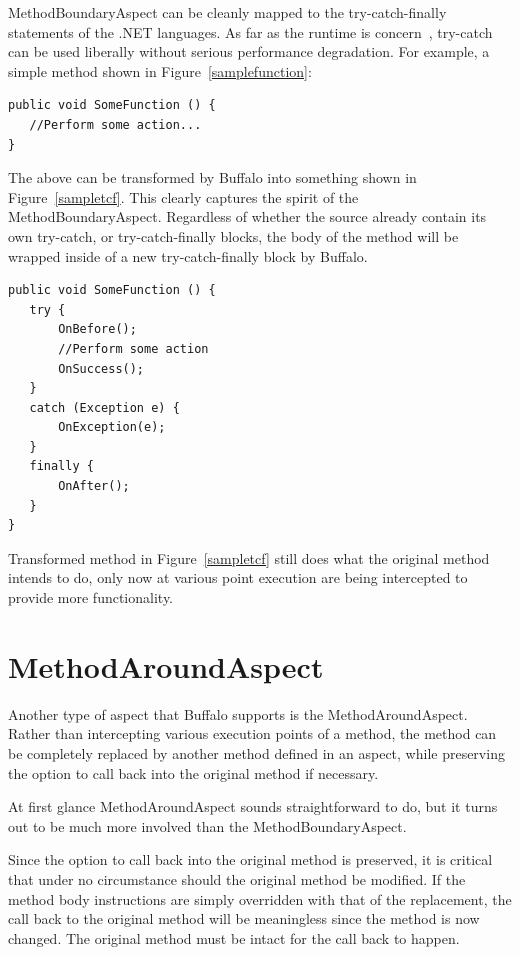 MethodBoundaryAspect can be cleanly mapped to the try-catch-finally statements of the .NET languages. As far as the runtime is concern~\cite{ecma334, ecma335}, try-catch can be used liberally without serious performance degradation. For example, a simple method shown in Figure~\ref{samplefunction}:

\begin{lstlisting}[caption={Sample function}, label=samplefunction]
public void SomeFunction () {
   //Perform some action...
}
\end{lstlisting}

The above can be transformed by Buffalo into something shown in Figure~\ref{sampletcf}. This clearly captures the spirit of the MethodBoundaryAspect. Regardless of whether the source already contain its own try-catch, or try-catch-finally blocks, the body of the method will be wrapped inside of a new try-catch-finally block by Buffalo.

\begin{lstlisting}[caption={Sample try-catch-finally}, label=sampletcf]
public void SomeFunction () {
   try {
       OnBefore();
       //Perform some action
       OnSuccess();
   }
   catch (Exception e) {
       OnException(e);
   }
   finally {
       OnAfter();
   }
}
\end{lstlisting}

Transformed method in Figure~\ref{sampletcf} still does what the original method intends to do, only now at various point execution are being intercepted to provide more functionality. 

\section{MethodAroundAspect}
Another type of aspect that Buffalo supports is the MethodAroundAspect. Rather than intercepting various execution points of a method, the method can be completely replaced by another method defined in an aspect, while preserving the option to call back into the original method if necessary.

At first glance MethodAroundAspect sounds straightforward to do, but it turns out to be much more involved than the MethodBoundaryAspect.

Since the option to call back into the original method is preserved, it is critical that under no circumstance should the original method be modified. If the method body instructions are simply overridden with that of the replacement, the call back to the original method will be meaningless since the method is now changed. The original method must be intact for the call back to happen.

